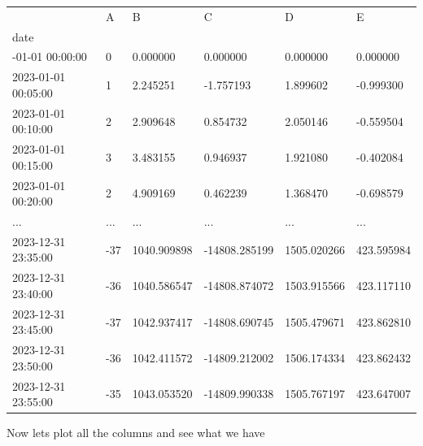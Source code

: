 \documentclass[
  letterpaper,
  DIV=11,
  numbers=noendperiod,
  oneside]{scrreprt}
\begin{document}
\begin{longtable}[]{@{}llllll@{}}
\toprule\noalign{}
& A & B & C & D & E \\
date & & & & & \\
\midrule\noalign{}
\endhead
\bottomrule\noalign{}
\endlastfoot
2023-01-01 00:00:00 & 0 & 0.000000 & 0.000000 & 0.000000 & 0.000000 \\
2023-01-01 00:05:00 & 1 & 2.245251 & -1.757193 & 1.899602 & -0.999300 \\
2023-01-01 00:10:00 & 2 & 2.909648 & 0.854732 & 2.050146 & -0.559504 \\
2023-01-01 00:15:00 & 3 & 3.483155 & 0.946937 & 1.921080 & -0.402084 \\
2023-01-01 00:20:00 & 2 & 4.909169 & 0.462239 & 1.368470 & -0.698579 \\
... & ... & ... & ... & ... & ... \\
2023-12-31 23:35:00 & -37 & 1040.909898 & -14808.285199 & 1505.020266 &
423.595984 \\
2023-12-31 23:40:00 & -36 & 1040.586547 & -14808.874072 & 1503.915566 &
423.117110 \\
2023-12-31 23:45:00 & -37 & 1042.937417 & -14808.690745 & 1505.479671 &
423.862810 \\
2023-12-31 23:50:00 & -36 & 1042.411572 & -14809.212002 & 1506.174334 &
423.862432 \\
2023-12-31 23:55:00 & -35 & 1043.053520 & -14809.990338 & 1505.767197 &
423.647007 \\
\end{longtable}

Now lets plot all the columns and see what we have
\end{document}
